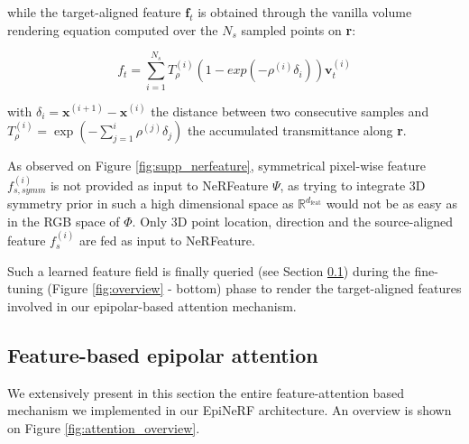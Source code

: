 while the target-aligned feature $\mathbf{f}_{t}$ is obtained through the vanilla volume rendering equation computed over the $N_s$ sampled points on \textbf{r}: 

\begin{equation}
    f_{t} = \sum_{i=1}^{N_{s}} T_{\rho}^{(i)}(1-exp(-\rho^{(i)}\delta_{i}))\mathbf{v}_{t}^{(i)}
\end{equation}

with $\delta_{i}=\mathbf{x}^{(i+1)}-\mathbf{x}^{(i)}$  the distance between two consecutive samples and $T_{\rho}^{(i)} = \exp\left(-\sum_{j=1}^{i}\rho^{(j)}\delta_{j}\right)$ the accumulated transmittance along \textbf{r}.

As observed on Figure \ref{fig:supp_nerfeature}, symmetrical pixel-wise feature $f_{s,symm}^{(i)}$ is not provided as input to NeRFeature $\Psi$, as trying to integrate 3D symmetry prior in such a high dimensional space as $\mathbb{R}^{d_{\text{feat}}}$ would not be as easy as in the RGB space of $\Phi$. Only 3D point location, direction and the source-aligned feature $f_{s}^{(i)}$ are fed as input to NeRFeature. 

 Such a learned feature field is finally queried (see Section \ref{subsec:epipolar_att}) during the fine-tuning (Figure \ref{fig:overview} - bottom) phase to render the target-aligned features involved in our epipolar-based attention mechanism. 
 
\subsection{Feature-based epipolar attention}
\label{subsec:epipolar_att}

We extensively present in this section the entire feature-attention based mechanism we implemented in our EpiNeRF architecture. An overview is shown on Figure \ref{fig:attention_overview}. 

